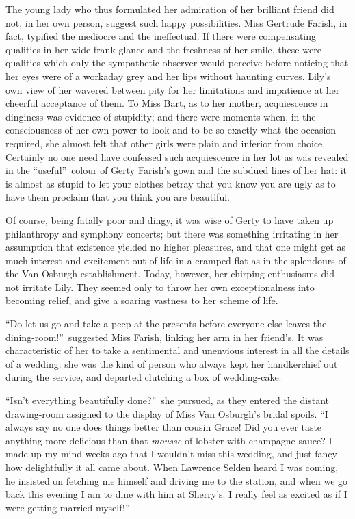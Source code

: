 \documentclass[12pt,a4paper]{book}
\begin{document}
The young lady who thus formulated her admiration of her
brilliant friend did not, in her own person, suggest such
happy possibilities. Miss Gertrude Farish, in fact, typified the
mediocre and the ineffectual. If there were compensating
qualities in her wide frank glance and the freshness of her
smile, these were qualities which only the sympathetic observer
would perceive before noticing that her eyes were of a workaday
grey and her lips without haunting curves. Lily's own view of her
wavered between pity for her limitations and impatience at her
cheerful acceptance of them. To Miss Bart, as to her mother,
acquiescence in dinginess was evidence of stupidity; and there
were moments when, in the consciousness of her own power to look
and to be so exactly what the occasion required, she almost felt
that other girls were plain and inferior from choice. Certainly
no one need have confessed such acquiescence in her lot as was
revealed in the ``useful''\ colour of Gerty Farish's gown and the
subdued lines of her hat: it is almost as stupid to let your
clothes betray that you know you are ugly as to have them
proclaim that you think you are beautiful.





Of course, being fatally poor and dingy, it was wise of Gerty to
have taken up philanthropy and symphony concerts; but there was
something irritating in her assumption that existence yielded no
higher pleasures, and that one might get as much interest and
excitement out of life in a cramped flat as in the splendours of
the Van Osburgh establishment. Today, however, her chirping
enthusiasms did not irritate Lily. They seemed only to throw her
own exceptionalness into becoming relief, and give a soaring
vastness to her scheme of life.





``Do let us go and take a peep at the presents before everyone
else leaves the dining-room!''\ suggested Miss Farish, linking her
arm in her friend's. It was characteristic of her to take a
sentimental and unenvious interest in all the details of a
wedding: she was the kind of person who always kept her
handkerchief out during the service, and departed clutching a box
of wedding-cake.





``Isn't everything beautifully done?''\ she pursued, as they entered
the distant drawing-room assigned to the display of Miss Van
Osburgh's bridal spoils. ``I always say no one does things better
than cousin Grace! Did you ever taste anything more delicious
than that \textit{mousse} of lobster with champagne sauce? I made up my
mind weeks ago that I wouldn't miss this wedding, and just
fancy how delightfully it all came about. When Lawrence Selden
heard I was coming, he insisted on fetching me himself and
driving me to the station, and when we go back this evening I am
to dine with him at Sherry's. I really feel as excited as if I
were getting married myself!''
\end{document}
